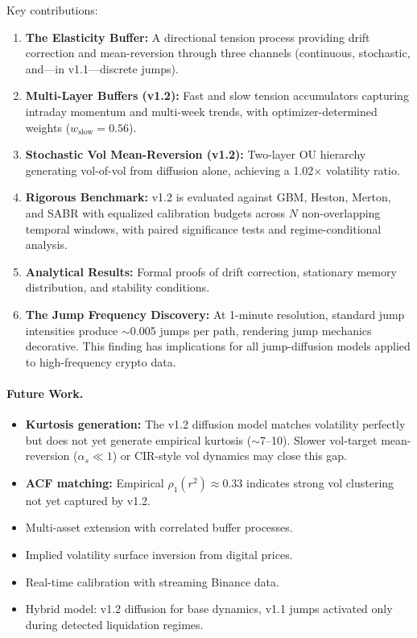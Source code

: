 \documentclass[11pt,a4paper]{article}
\begin{document}
Key contributions:
\begin{enumerate}[nosep]
  \item \textbf{The Elasticity Buffer:} A directional tension process
    providing drift correction and mean-reversion through three channels
    (continuous, stochastic, and---in v1.1---discrete jumps).
  \item \textbf{Multi-Layer Buffers (v1.2):} Fast and slow tension
    accumulators capturing intraday momentum and multi-week trends,
    with optimizer-determined weights ($w_{\text{slow}} = 0.56$).
  \item \textbf{Stochastic Vol Mean-Reversion (v1.2):} Two-layer OU
    hierarchy generating vol-of-vol from diffusion alone, achieving
    a 1.02$\times$ volatility ratio.
  \item \textbf{Rigorous Benchmark:} v1.2 is evaluated against GBM, Heston,
    Merton, and SABR with equalized calibration budgets across $N$
    non-overlapping temporal windows, with paired significance tests
    and regime-conditional analysis.
  \item \textbf{Analytical Results:} Formal proofs of drift correction,
    stationary memory distribution, and stability conditions.
  \item \textbf{The Jump Frequency Discovery:} At 1-minute resolution,
    standard jump intensities produce $\sim$0.005 jumps per path,
    rendering jump mechanics decorative. This finding has implications
    for all jump-diffusion models applied to high-frequency crypto data.
\end{enumerate}

\paragraph{Future Work.}
\begin{itemize}[nosep]
  \item \textbf{Kurtosis generation:} The v1.2 diffusion model matches
    volatility perfectly but does not yet generate empirical kurtosis
    ($\sim$7--10). Slower vol-target mean-reversion ($\alpha_s \ll 1$)
    or CIR-style vol dynamics may close this gap.
  \item \textbf{ACF matching:} Empirical $\rho_1(r^2) \approx 0.33$
    indicates strong vol clustering not yet captured by v1.2.
  \item Multi-asset extension with correlated buffer processes.
  \item Implied volatility surface inversion from digital prices.
  \item Real-time calibration with streaming Binance data.
  \item Hybrid model: v1.2 diffusion for base dynamics, v1.1 jumps
    activated only during detected liquidation regimes.
\end{itemize}
\end{document}
